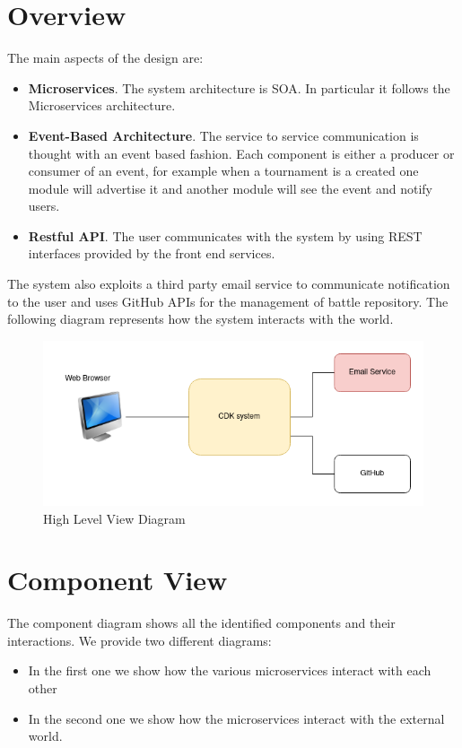 \section{Overview}
The main aspects of the design are:
\begin{itemize}
    \item \textbf{Microservices}. The system architecture is \ac{SOA}. In particular it follows the Microservices architecture.
    \item \textbf{Event-Based Architecture}. The service to service communication is thought with an event based fashion. Each component is either a producer or consumer of an event, for example when a tournament is a created one module will advertise it and another module will see the event and notify users.
    \item \textbf{Restful API}. The user communicates with the system by using REST interfaces provided by the front end services. 
\end{itemize}
The system also exploits a third party email service to communicate notification to the user and uses GitHub APIs for the management of battle repository.
The following diagram represents how the system interacts with the world.
\begin{figure}[H]
    \centering
    \includegraphics[width=1\linewidth]{misc/overviewDiagram.png}
    \caption{High Level View Diagram}
    \label{fig:enter-label}
\end{figure}

\newpage

\section{Component View}

The component diagram shows all the identified components and their interactions. We provide two different diagrams: 
\begin{itemize}
    \item In the first one we show how the various microservices interact with each other
    \item In the second one we show how the microservices interact with the external world.
\end{itemize}

